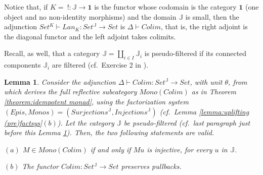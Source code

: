 \documentclass[12pt,a4paper]{amsart}
\newtheorem{lemma}{Lemma}[section]
\theoremstyle{definition}
\begin{document}
Notice that, if $K=\ !:\mathbb{J}\rightarrow\mathbf{1}$ is the functor whose codomain is the category $\mathbf{1}$ (one object and no non-identity morphisms) and the domain $\mathbb{J}$ is small, then the adjunction $Set^K\vdash Lan_K:Set^\mathbb{J}\rightarrow Set$ is $\Delta\vdash Colim$, that is, the right adjoint is the diagonal functor and the left adjoint takes colimits.

Recall, as well, that a category $\mathbb{J}=\coprod_{i\in I}\mathbb{J}_i$ is pseudo-filtered if its connected components $\mathbb{J}_i$ are filtered (cf.\ Exercise 2 in \cite[\S IX.2]{SM:cat}).

\begin{lemma}\label{lemma:colim functor}
Consider the adjunction $\Delta\vdash Colim: Set^\mathbb{J}\rightarrow Set$, with unit $\theta$, from which derives the full reflective subcategory $Mono(Colim)$ as in Theorem \ref{theorem:idempotent monad}, using the factorization system $(Epis,Monos)=(Surjections^\mathbb{J},Injections^\mathbb{J})$ (cf.\ Lemma \ref{lemma:uplifting (pre)factsys}$(b)$). Let the category $\mathbb{J}$ be pseudo-filtered (cf.\ last paragraph just before this Lemma \ref{lemma:colim functor}). Then, the two following statements are valid.

\noindent $(a)$ $M\in Mono(Colim)$ if and only if $Mu$ is injective, for every $u$ in $\mathbb{J}$.

\noindent $(b)$ The functor $Colim: Set^\mathbb{J}\rightarrow Set$ preserves pullbacks.
\end{lemma}
\end{document}
